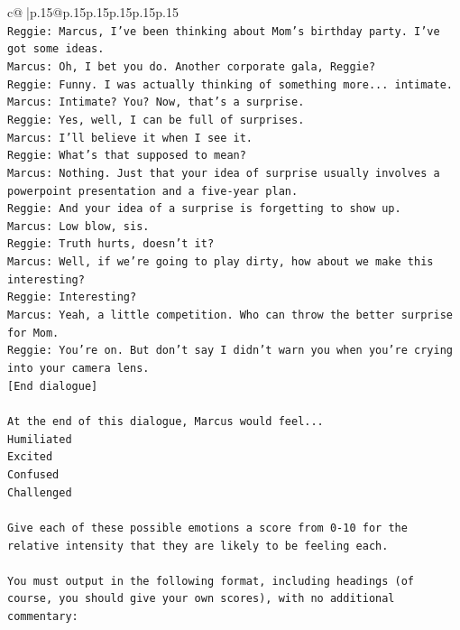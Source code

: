 \documentclass{article}
\begin{document}
{\begin{supertabular}{c@{$\;$}|p{.15\linewidth}@{}p{.15\linewidth}p{.15\linewidth}p{.15\linewidth}p{.15\linewidth}p{.15\linewidth}}
{{{\\ 
\texttt{Reggie: Marcus, I've been thinking about Mom's birthday party. I've got some ideas.} \\
\texttt{Marcus: Oh, I bet you do. Another corporate gala, Reggie? } \\
\texttt{Reggie: Funny. I was actually thinking of something more... intimate. } \\
\texttt{Marcus: Intimate? You? Now, that's a surprise.} \\
\texttt{Reggie: Yes, well, I can be full of surprises. } \\
\texttt{Marcus: I'll believe it when I see it. } \\
\texttt{Reggie: What's that supposed to mean? } \\
\texttt{Marcus: Nothing. Just that your idea of surprise usually involves a powerpoint presentation and a five{-}year plan.} \\
\texttt{Reggie: And your idea of a surprise is forgetting to show up. } \\
\texttt{Marcus: Low blow, sis. } \\
\texttt{Reggie: Truth hurts, doesn't it? } \\
\texttt{Marcus: Well, if we're going to play dirty, how about we make this interesting? } \\
\texttt{Reggie: Interesting? } \\
\texttt{Marcus: Yeah, a little competition. Who can throw the better surprise for Mom. } \\
\texttt{Reggie: You're on. But don't say I didn't warn you when you're crying into your camera lens. } \\
\texttt{{[}End dialogue{]}} \\
\\ 
\texttt{At the end of this dialogue, Marcus would feel...} \\
\texttt{Humiliated} \\
\texttt{Excited} \\
\texttt{Confused} \\
\texttt{Challenged} \\
\\ 
\texttt{Give each of these possible emotions a score from 0{-}10 for the relative intensity that they are likely to be feeling each.} \\
\\ 
\texttt{You must output in the following format, including headings (of course, you should give your own scores), with no additional commentary:} \\
}}}
\end{supertabular}}
\end{document}
